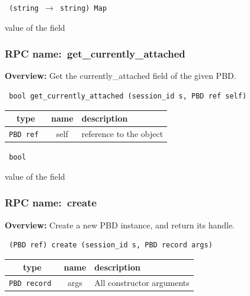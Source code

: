 \vspace{0.3cm}

{\tt 
(string $\rightarrow$ string) Map
}


value of the field
\vspace{0.3cm}
\vspace{0.3cm}
\vspace{0.3cm}
\subsubsection{RPC name:~get\_currently\_attached}

{\bf Overview:} 
Get the currently\_attached field of the given PBD.

\begin{verbatim} bool get_currently_attached (session_id s, PBD ref self)\end{verbatim}



 
\vspace{0.3cm}
\begin{tabular}{|c|c|p{7cm}|}
 \hline
{\bf type} & {\bf name} & {\bf description} \\ \hline
{\tt PBD ref } & self & reference to the object \\ \hline 

\end{tabular}

\vspace{0.3cm}

{\tt 
bool
}


value of the field
\vspace{0.3cm}
\vspace{0.3cm}
\vspace{0.3cm}
\subsubsection{RPC name:~create}

{\bf Overview:} 
Create a new PBD instance, and return its handle.

\begin{verbatim} (PBD ref) create (session_id s, PBD record args)\end{verbatim}



 
\vspace{0.3cm}
\begin{tabular}{|c|c|p{7cm}|}
 \hline
{\bf type} & {\bf name} & {\bf description} \\ \hline
{\tt PBD record } & args & All constructor arguments \\ \hline 

\end{tabular}

